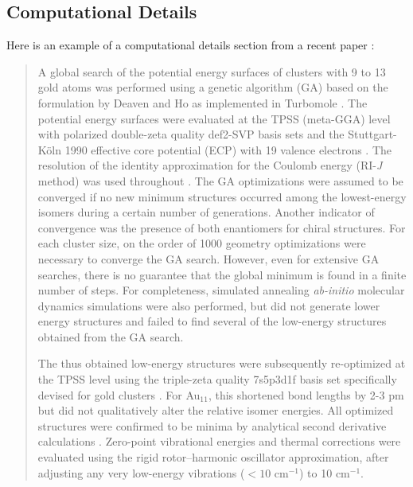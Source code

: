 \documentclass[11pt]{article}
\begin{document}
\subsection{Computational Details}

Here is an example of a computational details section from a recent
paper \cite{Johannson14JPhysChemC118p29370}:

\begin{quote}
A global search of the potential energy surfaces of clusters with 9 to 13
gold atoms was performed using a genetic algorithm (GA)
\cite{Hartke.B:ACIE.2002, Johnston.R:DT.2003} based on the formulation by
Deaven and Ho \cite{Deaven.D:PRL.1995} as implemented in {\sc Turbomole}
\cite{Sierka.M:ACIE.2007}. The potential energy surfaces were evaluated at
the TPSS (meta-GGA) level \cite{Tao.J:PRL.2003} with polarized double-zeta
quality def2-SVP basis sets \cite{Weigend.F:PCCP.2005, Weigend.F:PCCP.2006}
and the Stuttgart-K\"{o}ln 1990 effective core potential (ECP) with 19
valence electrons \cite{Andrae.D:TCA.1990}. The resolution of the identity
approximation for the Coulomb energy (RI-\textit{J} method) was used
throughout \cite{Eichkorn.K:CPL.1995}. The GA optimizations were assumed to
be converged if no new minimum structures occurred among the lowest-energy
isomers during a certain number of generations. Another indicator of
convergence was the presence of both enantiomers for chiral structures. For
each cluster size, on the order of 1000 geometry optimizations were necessary
to converge the GA search. However, even for
extensive GA searches, there is no guarantee that the global minimum is found
in a finite number of steps. For completeness, simulated annealing
\emph{ab-initio} molecular dynamics simulations \cite{Elliott00a} were also
performed, but did not generate lower energy structures and failed to
find several of the low-energy structures obtained from the GA search.

The thus obtained low-energy structures were subsequently re-optimized at the
TPSS level using the triple-zeta quality 7s5p3d1f basis set specifically
devised for gold clusters \cite{Gilb.S:JCP.2002}. For Au$_{11}$, this
shortened bond lengths by 2-3 pm but did not qualitatively alter the
relative isomer energies. All optimized structures were confirmed to
be minima by analytical second derivative calculations 
\cite{Deglmann04a, vanWullen.C:JCC.2011}. Zero-point vibrational energies and
thermal corrections were evaluated using the rigid rotor--harmonic oscillator
approximation, after adjusting any very low-energy vibrations ($< 10$
cm$^{-1}$) to 10 cm$^{-1}$.


\end{quote}
\end{document}
